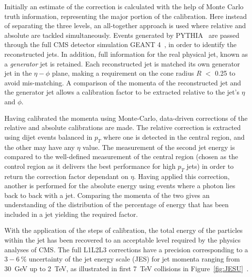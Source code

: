 Initially an estimate of the correction is calculated with the help of Monte Carlo truth information, representing the major portion of the calibration. Here instead of separating the three levels, an all-together approach is used where relative and absolute are tackled simultaneously. Events generated by \textsc{PYTHIA}~\cite{pythia} are passed through the full CMS detector simulation \textsc{GEANT 4}~\cite{GEANT4}, in order to identify the reconstructed jets. In addition, full information for the real physical jet, known as a \textit{generator} jet is retained. Each reconstructed jet is matched its own generator jet in the $\eta - \phi$ plane, making a requirement on the cone radius $R$ $<$ 0.25 to avoid mis-matching. A comparison of the momenta of the reconstructed jet and the generator jet allows a calibration factor to be extracted relative to the jet's $\eta$ and $\phi$. 

Having calibrated the momenta using Monte-Carlo, data-driven corrections of the relative and absolute calibrations are made. The relative correction is extracted using dijet events balanced in $p_{T}$ where one is detected in the central region, and the other may have any $\eta$ value. The measurement of the second jet energy is compared to the well-defined measurement of the central region (chosen as the control region as it delivers the best performance for high $p_{T}$ jets) in order to return the correction factor dependant on $\eta$.  Having applied this correction, another is performed for the absolute energy using events where a photon lies back to back with a jet. Comparing the momenta of the two gives an understanding of the distribution of the percentage of energy that has been included in a jet yielding the required factor.

With the application of the steps of calibration, the total energy of the particles within the jet has been recovered to an acceptable level required by the physics analyses of CMS. The full L1L2L3 corrections have a precision corresponding to a $3 - 6~\%$ uncertainty of the jet energy scale (JES) for jet momenta ranging from 30~GeV up to 2~TeV, as illustrated in first 7~TeV collisions in Figure~\ref{fig:JESU}~\cite{JME-10-010}.


